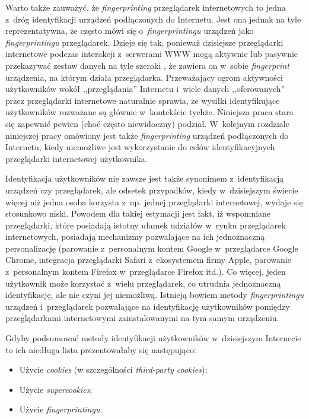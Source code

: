 Warto także zauważyć, że \emph{fingerprinting} przeglądarek internetowych to
jedna z~dróg identyfikacji urządzeń podłączonych do Internetu. Jest ona jednak
na tyle reprezentatywna, że często mówi się o~\emph{fingerprintingu} urządzeń
jako \emph{fingerprintingu} przeglądarek. Dzieje się tak, ponieważ dzisiejsze
przeglądarki internetowe podczas interakcji z~serwerami WWW mogą aktywnie lub
pasywnie przekazywać zestaw danych na tyle szeroki \cite{eckersley2010unique},
że zawiera on w~sobie \emph{fingerprint} urządzenia, na którym działa
przeglądarka. Przeważający ogrom aktywności użytkowników wokół ,,przeglądania''
Internetu i~wiele danych ,,oferowanych'' przez przeglądarki internetowe
naturalnie sprawia, że wysiłki identyfikujące użytkowników rozważane są głównie
w~kontekście tychże. Niniejsza praca stara się zapewnić pewien (choć często
niewidoczny) podział. W~kolejnym rozdziale niniejszej pracy omówiony jest także
\emph{fingerprinting} urządzeń podłączonych do Internetu, kiedy niemożliwe jest
wykorzystanie do celów identyfikacyjnych przeglądarki internetowej użytkownika.

Identyfikacja użytkowników nie zawsze jest także synonimem z~identyfikacją
urządzeń czy przeglądarek, ale odsetek przypadków, kiedy w~dzisiejszym świecie
więcej niż jedna osoba korzysta z~np. jednej przeglądarki internetowej, wydaje
się stosunkowo niski. Powodem dla takiej estymacji jest fakt, iż wspomniane
przeglądarki, które posiadają istotny ułamek udziałów w~rynku przeglądarek
internetowych, posiadają mechanizmy pozwalające na ich jednoznaczną
personalizację (parowanie z~personalnym kontem Google w~przeglądarce Google
Chrome, integracja przeglądarki Safari z~ekosystemem firmy Apple, parowanie
z~personalnym kontem Firefox w~przeglądarce Firefox itd.). Co więcej, jeden
użytkownik może korzystać z~wielu przeglądarek, co utrudnia jednoznaczną
identyfikację, ale nie czyni jej niemożliwą. Istnieją bowiem metody
\emph{fingerprintingu} urządzeń i~przeglądarek pozwalające na identyfikację
użytkowników pomiędzy przeglądarkami internetowymi zainstalowanymi na tym samym
urządzeniu.

Gdyby podsumować metody identyfikacji użytkowników w~dzisiejszym Internecie to
ich niedługa lista prezentowałaby się następująco:
\begin{itemize}
	\item Użycie \emph{cookies} (w szczególności \emph{third-party cookies});
	\item Użycie \emph{supercookies};
	\item Użycie \emph{fingerprintingu}.
\end{itemize}

